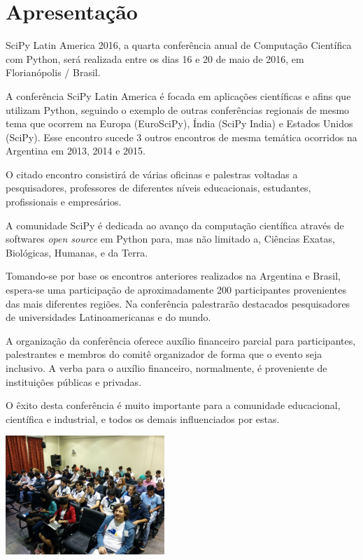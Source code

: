 \documentclass[a4paper,twocolumn,openright,article,12pt]{memoir}
\begin{document}
\clearpage

\restoregeometry
\pagestyle{plain} %
\setcounter{page}{2}
\tableofcontents*

\chapter*{Apresentação}

SciPy Latin America 2016, a quarta conferência anual de Computação Científica com Python, será realizada entre os dias 16 e 20 de maio de 2016, em Florianópolis / Brasil.

A conferência SciPy Latin America é focada em aplicações científicas e afins que
utilizam Python, seguindo o exemplo de outras conferências regionais de mesmo tema que ocorrem na Europa (EuroSciPy), Índia (SciPy India) e Estados Unidos (SciPy). Esse encontro sucede 3 outros encontros de mesma temática ocorridos na Argentina em 2013, 2014 e 2015.

O citado encontro consistirá de várias oficinas e palestras voltadas a pesquisadores, professores de diferentes níveis educacionais, estudantes, profissionais e empresários.

A comunidade SciPy é dedicada ao avanço da computação científica através de softwares \emph{open source} em Python para, mas não limitado a, Ciências Exatas, Biológicas, Humanas, e da Terra.

Tomando-se por base os encontros anteriores realizados na Argentina e Brasil, espera-se uma participação de aproximadamente 200 participantes provenientes das mais diferentes regiões. Na conferência palestrarão destacados pesquisadores de universidades Latinoamericanas e do mundo.

A organização da conferência oferece auxílio financeiro parcial para participantes,
palestrantes e membros do comitê organizador de forma que o evento seja inclusivo.
A verba para o auxílio financeiro, normalmente, é proveniente
de instituições públicas e privadas.

O êxito desta conferência é muito importante para a comunidade educacional, científica e industrial, e todos os demais influenciados por estas.

\ifprint
\else
	\begin{center}
          \includegraphics[width=6cm]{../img/IMG_20150521_102157-small.jpg}
	\end{center}
\fi
\end{document}
